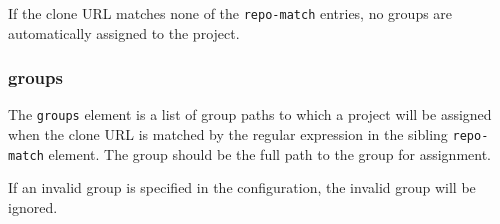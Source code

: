 If the clone URL matches none of the \texttt{repo-match} entries, no groups are automatically assigned
to the project.

\subsubsection{groups}

The \texttt{groups} element is a list of group paths to which a project will be assigned when the clone URL
is matched by the regular expression in the sibling \texttt{repo-match} element.  The group should be the full
path to the group for assignment.

If an invalid group is specified in the configuration, the invalid group will be ignored.

